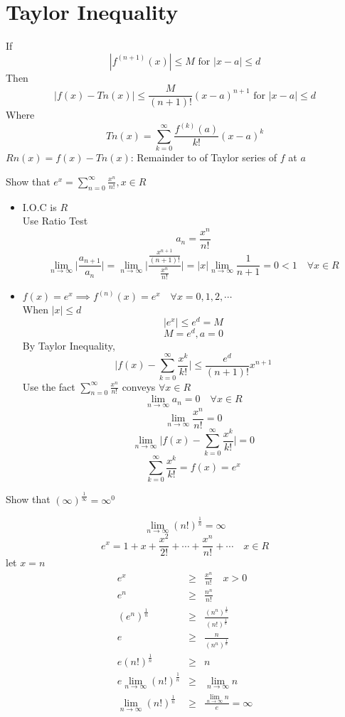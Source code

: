 \section{Taylor Inequality}
\begin{defn}
If 
\[|f^{(n + 1)} (x)| \leq M \text{ for } |x - a| \leq d\] 
Then
\[\displaystyle |f(x) - Tn(x)| \leq \frac{M}{(n + 1)!} (x- a)^{n + 1} \text{ for } |x - a| \leq d\]
Where 
\[\displaystyle Tn(x) = \sum^{\infty}_{k = 0} \frac{f^{(k)} (a)}{k!} (x - a)^k\]
\(Rn(x) = f(x) - Tn(x)\): Remainder to of Taylor series of \(f\) at \(a\)
\end{defn}
\begin{eg}
Show that \(\displaystyle e^x = \sum^{\infty}_{n = 0} \frac{x^n}{n!}, x \in R\)

\soln
\begin{itemize}
\item I.O.C is \(R\)\\
Use Ratio Test
\[\displaystyle a_n = \frac{x^n}{n!}\]
\[\displaystyle \lim_{n \to \infty} \Big| \frac{a_{n + 1}}{a_n} \Big| = \lim_{n \to \infty} \Bigg| \frac{\frac{x^{n + 1}}{(n + 1)!}}{\frac{x^n}{n!}} \Bigg| = |x| \lim_{n \to \infty} \frac{1}{n + 1} = 0 < 1 \quad \forall x \in R\]
\item \(f(x) = e^x \implies f^{(n)} (x) = e^x \quad \forall x = 0, 1, 2, \cdots\)\\
When \(|x| \leq d\) 
\[ |e^x| \leq e^d = M\]
\[M = e^d, a = 0\] 
By Taylor Inequality,
\[\displaystyle \Big| f(x) - \sum^{\infty}_{k = 0} \frac{x^k}{k!} \Big| \leq \frac{e^d}{(n + 1)!} x^{n + 1}\]
Use the fact \(\displaystyle \sum^{\infty}_{n = 0} \frac{x^n}{n!}\) conveys \(\forall x \in R\)
\[\displaystyle \lim_{n \to \infty} a_n = 0 \quad \forall x \in R\]
\[\displaystyle \lim_{n \to \infty} \frac{x^n}{n!} = 0\]
\[\displaystyle \lim_{n \to \infty} \Big| f(x) - \sum^{\infty}_{k =0} \frac{x^k}{k!} \Big| = 0\]
\[\displaystyle \sum^{\infty}_{k = 0} \frac{x^k}{k!} = f(x) = e^x\]
\end{itemize}
\end{eg}
\begin{eg}
Show that \(\displaystyle (\infty)^{\frac{1}{\infty}} = \infty^0\)

\soln
\[\displaystyle \lim_{n \to \infty} (n!)^{\frac{1}{n}} = \infty\]
\[\displaystyle e^x = 1 + x + \frac{x^2}{2!} + \cdots + \frac{x^n}{n!} + \cdots \quad x \in R\]
let \(x = n\)
\[\begin{array}{rcl}
e^x & \geq & \displaystyle \frac{x^n}{n!} \quad x > 0\\
e^n & \geq & \displaystyle \frac{n^n}{n!}\\
(e^n)^{\frac{1}{n}} & \geq & \displaystyle \frac{(n^n)^{\frac{1}{n}}}{(n!)^{\frac{1}{n}}}\\
e & \geq & \displaystyle \frac{n}{(n^n)^{\frac{1}{n}}}\\
e(n!)^{\frac{1}{n}} & \geq & \displaystyle n\\
\displaystyle e \lim_{n \to \infty} (n!)^{\frac{1}{n}} & \geq & \displaystyle \lim_{n \to \infty} n\\
\displaystyle \lim_{n \to \infty} (n!)^{\frac{1}{n}} & \geq & \displaystyle \frac{\displaystyle \lim_{n \to \infty} n}{e} = \infty
\end{array}\]
\end{eg}
